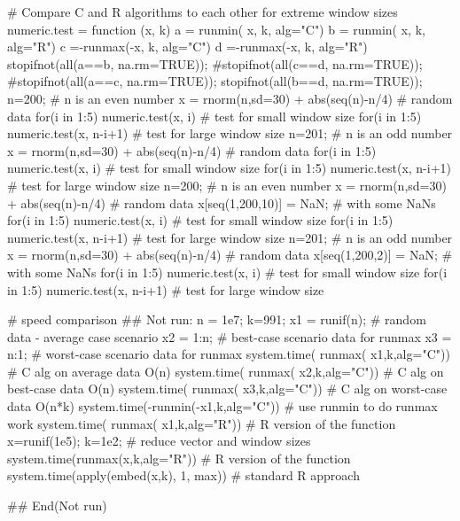 \begin{Examples}
\begin{ExampleCode}
  # Compare C and R algorithms to each other for extreme window sizes
  numeric.test = function (x, k) {
    a = runmin( x, k, alg="C")
    b = runmin( x, k, alg="R")
    c =-runmax(-x, k, alg="C")
    d =-runmax(-x, k, alg="R")
    stopifnot(all(a==b, na.rm=TRUE));
    #stopifnot(all(c==d, na.rm=TRUE)); 
    #stopifnot(all(a==c, na.rm=TRUE));
    stopifnot(all(b==d, na.rm=TRUE));
  }
  n=200;                               # n is an even number
  x = rnorm(n,sd=30) + abs(seq(n)-n/4) # random data
  for(i in 1:5) numeric.test(x, i)     # test for small window size
  for(i in 1:5) numeric.test(x, n-i+1) # test for large window size
  n=201;                               # n is an odd number
  x = rnorm(n,sd=30) + abs(seq(n)-n/4) # random data
  for(i in 1:5) numeric.test(x, i)     # test for small window size
  for(i in 1:5) numeric.test(x, n-i+1) # test for large window size
  n=200;                               # n is an even number
  x = rnorm(n,sd=30) + abs(seq(n)-n/4) # random data
  x[seq(1,200,10)] = NaN;              # with some NaNs
  for(i in 1:5) numeric.test(x, i)     # test for small window size
  for(i in 1:5) numeric.test(x, n-i+1) # test for large window size
  n=201;                               # n is an odd number
  x = rnorm(n,sd=30) + abs(seq(n)-n/4) # random data
  x[seq(1,200,2)] = NaN;               # with some NaNs
  for(i in 1:5) numeric.test(x, i)     # test for small window size
  for(i in 1:5) numeric.test(x, n-i+1) # test for large window size

  # speed comparison
  ## Not run: 
  n = 1e7;  k=991; 
  x1 = runif(n);                       # random data - average case scenario
  x2 = 1:n;                            #  best-case scenario data for runmax
  x3 = n:1;                            # worst-case scenario data for runmax
  system.time( runmax( x1,k,alg="C"))  # C alg on average data O(n)
  system.time( runmax( x2,k,alg="C"))  # C alg on  best-case data O(n)
  system.time( runmax( x3,k,alg="C"))  # C alg on worst-case data O(n*k)
  system.time(-runmin(-x1,k,alg="C"))  # use runmin to do runmax work
  system.time( runmax( x1,k,alg="R"))  # R version of the function
  x=runif(1e5); k=1e2;                 # reduce vector and window sizes
  system.time(runmax(x,k,alg="R"))     # R version of the function
  system.time(apply(embed(x,k), 1, max)) # standard R approach 
  
## End(Not run)
\end{ExampleCode}
\end{Examples}

